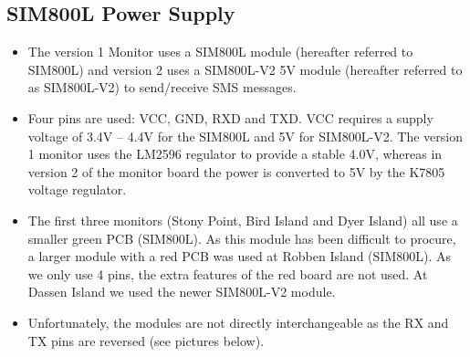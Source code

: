 \documentclass[
  letterpaper,
]{scrbook}
\begin{document}
\subsection{SIM800L Power Supply}\label{sim800l-power-supply}

\begin{itemize}
\item
  The version 1 Monitor uses a SIM800L module (hereafter referred to
  SIM800L) and version 2 uses a SIM800L-V2 5V module (hereafter referred
  to as SIM800L-V2) to send/receive SMS messages.
\item
  Four pins are used: VCC, GND, RXD and TXD. VCC requires a supply
  voltage of 3.4V -- 4.4V for the SIM800L and 5V for SIM800L-V2. The
  version 1 monitor uses the LM2596 regulator to provide a stable 4.0V,
  whereas in version 2 of the monitor board the power is converted to 5V
  by the K7805 voltage regulator.
\item
  The first three monitors (Stony Point, Bird Island and Dyer Island)
  all use a smaller green PCB (SIM800L). As this module has been
  difficult to procure, a larger module with a red PCB was used at
  Robben Island (SIM800L). As we only use 4 pins, the extra features of
  the red board are not used. At Dassen Island we used the newer
  SIM800L-V2 module.
\item
  Unfortunately, the modules are not directly interchangeable as the RX
  and TX pins are reversed (see pictures below).
\end{itemize}
\end{document}
